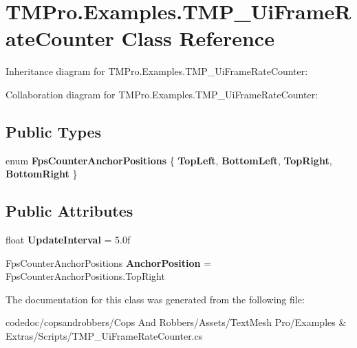 \hypertarget{classTMPro_1_1Examples_1_1TMP__UiFrameRateCounter}{}\section{T\+M\+Pro.\+Examples.\+T\+M\+P\+\_\+\+Ui\+Frame\+Rate\+Counter Class Reference}
\label{classTMPro_1_1Examples_1_1TMP__UiFrameRateCounter}


Inheritance diagram for T\+M\+Pro.\+Examples.\+T\+M\+P\+\_\+\+Ui\+Frame\+Rate\+Counter\+:


Collaboration diagram for T\+M\+Pro.\+Examples.\+T\+M\+P\+\_\+\+Ui\+Frame\+Rate\+Counter\+:
\subsection*{Public Types}
\begin{DoxyCompactItemize}
\item 
\mbox{\label{classTMPro_1_1Examples_1_1TMP__UiFrameRateCounter_acd8edef652a3eca75ad3e389002d2ece}} 
enum {\bfseries Fps\+Counter\+Anchor\+Positions} \{ {\bfseries Top\+Left}, 
{\bfseries Bottom\+Left}, 
{\bfseries Top\+Right}, 
{\bfseries Bottom\+Right}
 \}
\end{DoxyCompactItemize}
\subsection*{Public Attributes}
\begin{DoxyCompactItemize}
\item 
\mbox{\label{classTMPro_1_1Examples_1_1TMP__UiFrameRateCounter_a826c5dd240c35cc3cec70d82d0e6d76e}} 
float {\bfseries Update\+Interval} = 5.\+0f
\item 
\mbox{\label{classTMPro_1_1Examples_1_1TMP__UiFrameRateCounter_a1088605129e1b56d212d3dd4aa9d1e80}} 
Fps\+Counter\+Anchor\+Positions {\bfseries Anchor\+Position} = Fps\+Counter\+Anchor\+Positions.\+Top\+Right
\end{DoxyCompactItemize}


The documentation for this class was generated from the following file\+:\begin{DoxyCompactItemize}
\item 
codedoc/copsandrobbers/\+Cops And Robbers/\+Assets/\+Text\+Mesh Pro/\+Examples \& Extras/\+Scripts/T\+M\+P\+\_\+\+Ui\+Frame\+Rate\+Counter.\+cs\end{DoxyCompactItemize}
